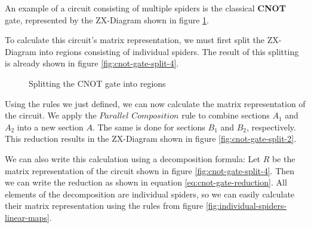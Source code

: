 An example of a circuit consisting of multiple spiders is the classical \textbf{CNOT} gate, represented by the ZX-Diagram shown in figure \ref{fig:cnot-gate-split}.

To calculate this circuit's matrix representation, we must first split the ZX-Diagram into regions consisting of individual spiders. The result of this splitting is already shown in figure \ref{fig:cnot-gate-split-4}.

\begin{figure}
    \centering
    \qquad
    \caption{Splitting the CNOT gate into regions}
    \label{fig:cnot-gate-split}
\end{figure}

Using the rules we just defined, we can now calculate the matrix representation of the circuit. We apply the $\textit{Parallel Composition}$ rule to combine sections $A_1$ and $A_2$ into a new section $A$. The same is done for sections $B_1$ and $B_2$, respectively. This reduction results in the ZX-Diagram shown in figure \ref{fig:cnot-gate-split-2}.

We can also write this calculation using a decomposition formula: Let $R$ be the matrix representation of the circuit shown in figure \ref{fig:cnot-gate-split-4}. Then we can write the reduction as shown in equation \ref{eq:cnot-gate-reduction}. All elements of the decomposition are individual spiders, so we can easily calculate their matrix representation using the rules from figure \ref{fig:individual-spiders-linear-maps}.


